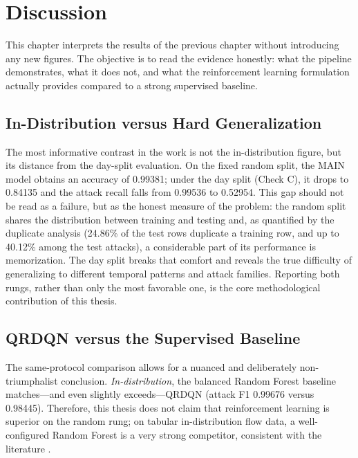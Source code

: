 \chapter{Discussion}

This chapter interprets the results of the previous chapter without introducing any new figures. The objective is to read the evidence honestly: what the pipeline demonstrates, what it does not, and what the reinforcement learning formulation actually provides compared to a strong supervised baseline.

\section{In-Distribution versus Hard Generalization}
The most informative contrast in the work is not the in-distribution figure, but its distance from the day-split evaluation. On the fixed random split, the MAIN model obtains an accuracy of 0.99381; under the day split (Check C), it drops to 0.84135 and the attack recall falls from 0.99536 to 0.52954. This gap should not be read as a failure, but as the honest measure of the problem: the random split shares the distribution between training and testing and, as quantified by the duplicate analysis (24.86\% of the test rows duplicate a training row, and up to 40.12\% among the test attacks), a considerable part of its performance is memorization. The day split breaks that comfort and reveals the true difficulty of generalizing to different temporal patterns and attack families. Reporting both rungs, rather than only the most favorable one, is the core methodological contribution of this thesis.

\section{QRDQN versus the Supervised Baseline}
The same-protocol comparison allows for a nuanced and deliberately non-triumphalist conclusion. \emph{In-distribution}, the balanced Random Forest baseline matches---and even slightly exceeds---QRDQN (attack F1 0.99676 versus 0.98445). Therefore, this thesis does not claim that reinforcement learning is superior on the random rung; on tabular in-distribution flow data, a well-configured Random Forest is a very strong competitor, consistent with the literature \parencite{LiuLang2019IDSSurvey,Apruzzese2022CrossEvaluationNIDS}.

